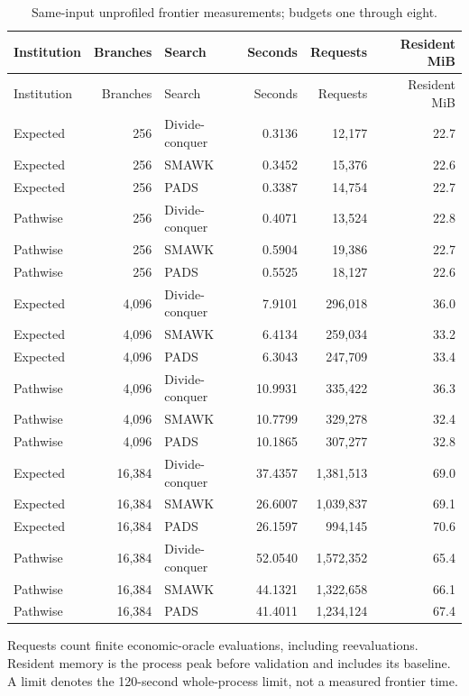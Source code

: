 \begin{longtable}{@{}lrlrrr@{}}
\caption{Same-input unprofiled frontier measurements; budgets one through eight.}\label{tab:r37-scale}\\
\toprule
Institution & Branches & Search & Seconds & Requests & Resident MiB \\
\midrule
\endfirsthead
\toprule
Institution & Branches & Search & Seconds & Requests & Resident MiB \\
\midrule
\endhead
\bottomrule
\endfoot
Expected & 256 & Divide-conquer & 0.3136 & 12,177 & 22.7 \\
Expected & 256 & SMAWK & 0.3452 & 15,376 & 22.6 \\
Expected & 256 & PADS & 0.3387 & 14,754 & 22.7 \\
Pathwise & 256 & Divide-conquer & 0.4071 & 13,524 & 22.8 \\
Pathwise & 256 & SMAWK & 0.5904 & 19,386 & 22.7 \\
Pathwise & 256 & PADS & 0.5525 & 18,127 & 22.6 \\
Expected & 4,096 & Divide-conquer & 7.9101 & 296,018 & 36.0 \\
Expected & 4,096 & SMAWK & 6.4134 & 259,034 & 33.2 \\
Expected & 4,096 & PADS & 6.3043 & 247,709 & 33.4 \\
Pathwise & 4,096 & Divide-conquer & 10.9931 & 335,422 & 36.3 \\
Pathwise & 4,096 & SMAWK & 10.7799 & 329,278 & 32.4 \\
Pathwise & 4,096 & PADS & 10.1865 & 307,277 & 32.8 \\
Expected & 16,384 & Divide-conquer & 37.4357 & 1,381,513 & 69.0 \\
Expected & 16,384 & SMAWK & 26.6007 & 1,039,837 & 69.1 \\
Expected & 16,384 & PADS & 26.1597 & 994,145 & 70.6 \\
Pathwise & 16,384 & Divide-conquer & 52.0540 & 1,572,352 & 65.4 \\
Pathwise & 16,384 & SMAWK & 44.1321 & 1,322,658 & 66.1 \\
Pathwise & 16,384 & PADS & 41.4011 & 1,234,124 & 67.4 \\
\end{longtable}
\noindent Requests count finite economic-oracle evaluations, including reevaluations. Resident memory is the process peak before validation and includes its baseline. A limit denotes the 120-second whole-process limit, not a measured frontier time.


